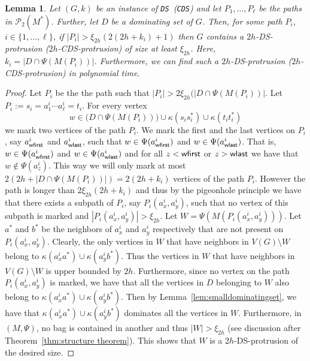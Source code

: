 \documentclass[11pt]{article}
\newtheorem{lemma}{Lemma}
\newcommand{\tDS}{{\texttt{\sc DS}}}
\newcommand{\tCDS}{{\texttt{\sc CDS}}}
\begin{document}
\begin{lemma}
\label{lem:boundingpaths}
Let $(G,k)$ be an instance of  \tDS\ (\tCDS) and let $P_1, \ldots,P_\ell$ be the  paths in $ \mathscr{P}_2(M^*)$. Further, let $D$ be a dominating set of $G$. 
Then,  for some path $P_i$, $i \in \{1,\ldots,\ell\}$, if $|P_i|> \xi_{2h} (2 (2h+k_i)+1)$ then $G$ contains a $2h$-{\sc DS}-protrusion ($2h$-{\sc CDS}-protrusion) of size at least $\xi_{2h}$.  Here,  $k_i=|D\cap \Psi(M(P_i))|$. Furthermore, we can find such a  $2h$-{\sc DS}-protrusion ($2h$-{\sc CDS}-protrusion) in polynomial time. 
\end{lemma}
\begin{proof} 
Let $P_i$ be the the path such that $|P_i|> 2 \xi_{2h} (|D\cap \Psi(M(P_i))|$. 
Let 
$P_i:=s_i=a_1^i\cdots a_{\ell}^i=t_i$. For 
every vertex 
\[ w \in \Big(D\cap \Psi(M(P_i))\Big) \cup \kappa(s_is_i^*) \cup \kappa(t_it_i^*) \]
we mark two vertices of the path $P_i$. We mark the first and 
the last vertices on $P_i$, say $a^i_{{\sf wfirst}}$ and $a^{i}_{{\sf wlast}}$, such that $w\in \Psi(a^i_{{\sf wfirst}})$ and $w\in \Psi(a^{i}_{{\sf wlast}})$.  That is, 
$w\in \Psi(a^i_{{\sf wfirst}})$ and $w\in \Psi(a^{i}_{{\sf wlast}})$ and for all $z< {\sf wfirst}$ or $z>{\sf wlast}$ we have that $w\notin \Psi(a^i_{z})$.  
This way we will only mark at most $2(2h+|D\cap \Psi(M(P_i))|)=2(2h+k_i)$ vertices of the path $P_i$. However the path is longer than 
$2 \xi_{2h} (2h+k_i)$  and thus by the pigeonhole principle we have that there exists a subpath of $P_i$, say $P_i(a^{i}_x,a^{i}_y)$, such that no vertex of this subpath is marked and $|P_i(a^{i}_x,a^{i}_y)|>\xi_{2h}$. 
 Let $W=\Psi(M(P_i(a^{i}_x,a^{i}_y)))$. Let $a^*$ and $b^*$ be the neighbors of $a^{i}_x$  and $a^{i}_y$ respectively 
that are not present on  
$P_i(a^{i}_x,a^{i}_y)$. Clearly, the only vertices in $W$ that have neighbors in $V(G)\setminus W$ belong to 
$\kappa(a^{i}_xa^*)\cup\kappa(a^{i}_yb^*)$.  
Thus the vertices in $W$ that have neighbors in $V(G)\setminus W$  is upper bounded by $2h$. Furthermore, since no vertex on the path $P_i(a^{i}_x,a^{i}_y)$ is marked, we have that all the vertices in $D$ belonging to $W$ also belong to $\kappa(a^{i}_xa^*)\cup\kappa(a^{i}_yb^*)$. Then by Lemma~\ref{lem:smalldominatingset}, we have that 
$\kappa(a^{i}_xa^*)\cup\kappa(a^{i}_yb^*)$ dominates all the vertices in $W$. Furthermore, in $(M,\Psi)$, 
no bag is contained in another and thus $|W|>\xi_{2h}$ (see discussion after Theorem~\ref{thm:structure theorem}). This shows that $W$ is a $2h$-{\sc DS}-protrusion of the desired size.
\end{proof}
\end{document}
